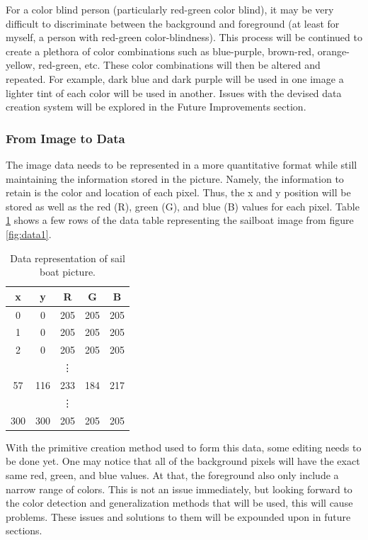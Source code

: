 \documentclass[12pt]{article}
\begin{document}
For a color blind person (particularly red-green color blind), it may be very difficult to discriminate between the background and foreground (at least for myself, a person with red-green color-blindness). This process will be continued to create a plethora of color combinations such as blue-purple, brown-red, orange-yellow, red-green, etc. These color combinations will then be altered and repeated. For example, dark blue and dark purple will be used in one image a lighter tint of each color will be used in another. Issues with the devised data creation system will be explored in the Future Improvements section.

\subsubsection{From Image to Data}
The image data needs to be represented in a more quantitative format while still maintaining the information stored in the picture. Namely, the information to retain is the color and location of each pixel. Thus, the x and y position will be stored as well as the red (R), green (G), and blue (B) values for each pixel. Table \ref{table:1} shows a few rows of the data table representing the sailboat image from figure \ref{fig:data1}. 

\begin{table}[H]
	\centering
		\caption{Data representation of sail boat picture.}
		\label{table:1}
	\begin{tabular}{ c c c c c}
		x & y & R & G & B \\\hline 
		0 & 0 & 205 & 205 & 205 \\  
		1 & 0 & 205 & 205 & 205 \\
		2 & 0 & 205 & 205 & 205 \\    
		&  & \vdots &  &  \\ 
		57 & 116 & 233 & 184 &217\\
		&  & \vdots &  &  \\ 
		300 & 300 & 205 & 205 & 205 \\		
	\end{tabular}

\end{table}

With the primitive creation method used to form this data, some editing needs to be done yet. One may notice that all of the background pixels will have the exact same red, green, and blue values. At that, the foreground also only include a narrow range of colors. This is not an issue immediately, but looking forward to the color detection and generalization methods that will be used, this will cause problems. These issues and solutions to them will be expounded upon in future sections.
\end{document}
